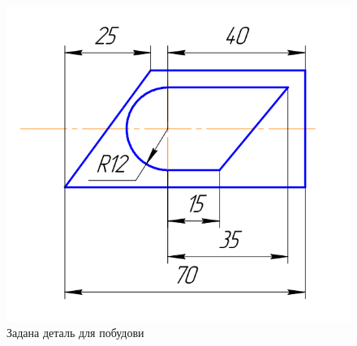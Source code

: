 \begin{figure}[!ht]
  \centering \includegraphics[width=0.9\linewidth]{./images/lab3/target-part.png}
  \caption{Задана деталь для побудови}
  \label{fig:lab3:target_part} 
\end{figure}

